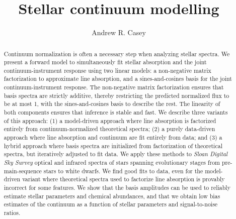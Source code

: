 \documentclass[modern]{aastex631}
\newcommand{\project}[1]{\textit{#1}}
\begin{document}
\title{\Huge Stellar continuum modelling}

\author[0000-0003-0174-0564]{Andrew R. Casey}



\begin{abstract}\noindent
Continuum normalization is often a necessary step when analyzing stellar spectra. 
We present a forward model to simultaneously fit stellar absorption and the joint continuum-instrument response using two linear models: a non-negative matrix factorization to approximate line absorption,
and a sines-and-cosines basis for the joint continuum-instrument response.
The non-negative matrix factorization ensures that basis spectra are strictly additive, thereby restricting the predicted normalized flux to be at most 1, with the sines-and-cosines basis to describe the rest.
The linearity of both components ensures that inference is stable and fast.
We describe three variants of this approach:
    (1) a model-driven approach where line absorption is factorized entirely from continuum-normalized theoretical spectra;
    (2) a purely data-driven approach where line absorption and continuum are fit entirely from data;
    and
    (3) a hybrid approach where basis spectra are initialized from factorization of theoretical spectra, but iteratively adjusted to fit data. 
We apply these methods to \project{Sloan Digital Sky Survey} optical and infrared spectra of stars spanning evolutionary stages from pre-main-sequence stars to white dwarfs.
We find good fits to data, even for the model-driven variant where theoretical spectra used to factorize line absorption is provably incorrect for some features.
We show that the basis amplitudes can be used to reliably estimate stellar parameters and chemical abundances, 
and that we obtain low bias estimates of the continuum as a function of stellar parameters and signal-to-noise ratios.
\end{abstract}
\end{document}
